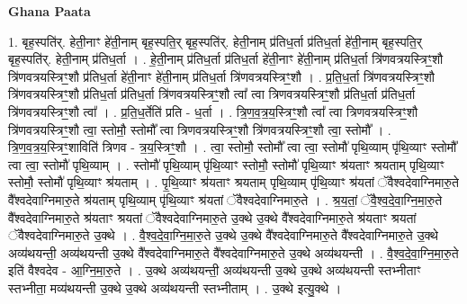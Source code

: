 \documentclass[17pt]{extarticle}
\begin{document}
\textbf{Ghana Paata } \newline

1. बृह॒स्पति॑र्. हेती॒नाꣳ हे॑ती॒नाम् बृह॒स्पति॒र् बृह॒स्पति॑र्. हेती॒नाम् प्र॑तिध॒र्ता प्र॑तिध॒र्ता हे॑ती॒नाम् बृह॒स्पति॒र् बृह॒स्पति॑र्. हेती॒नाम् प्र॑तिध॒र्ता । . हे॒ती॒नाम् प्र॑तिध॒र्ता प्र॑तिध॒र्ता हे॑ती॒नाꣳ हे॑ती॒नाम् प्र॑तिध॒र्ता त्रि॑णवत्रयस्त्रिꣳ॒॒शौ त्रि॑णवत्रयस्त्रिꣳ॒॒शौ प्र॑तिध॒र्ता हे॑ती॒नाꣳ हे॑ती॒नाम् प्र॑तिध॒र्ता त्रि॑णवत्रयस्त्रिꣳ॒॒शौ । . प्र॒ति॒ध॒र्ता त्रि॑णवत्रयस्त्रिꣳ॒॒शौ त्रि॑णवत्रयस्त्रिꣳ॒॒शौ प्र॑तिध॒र्ता प्र॑तिध॒र्ता त्रि॑णवत्रयस्त्रिꣳ॒॒शौ त्वा᳚ त्वा त्रिणवत्रयस्त्रिꣳ॒॒शौ प्र॑तिध॒र्ता प्र॑तिध॒र्ता त्रि॑णवत्रयस्त्रिꣳ॒॒शौ त्वा᳚ । . प्र॒ति॒ध॒र्तेति॑ प्रति - ध॒र्ता । . त्रि॒ण॒व॒त्र॒य॒स्त्रिꣳ॒॒शौ त्वा᳚ त्वा त्रिणवत्रयस्त्रिꣳ॒॒शौ त्रि॑णवत्रयस्त्रिꣳ॒॒शौ त्वा॒ स्तोमौ॒ स्तोमौ᳚ त्वा त्रिणवत्रयस्त्रिꣳ॒॒शौ त्रि॑णवत्रयस्त्रिꣳ॒॒शौ त्वा॒ स्तोमौ᳚ । . त्रि॒ण॒व॒त्र॒य॒स्त्रिꣳ॒॒शाविति॑ त्रिणव - त्र॒य॒स्त्रिꣳ॒॒शौ । . त्वा॒ स्तोमौ॒ स्तोमौ᳚ त्वा त्वा॒ स्तोमौ॑ पृथि॒व्याम् पृ॑थि॒व्याꣳ स्तोमौ᳚ त्वा त्वा॒ स्तोमौ॑ पृथि॒व्याम् । . स्तोमौ॑ पृथि॒व्याम् पृ॑थि॒व्याꣳ स्तोमौ॒ स्तोमौ॑ पृथि॒व्याꣳ श्र॑यताꣳ श्रयताम् पृथि॒व्याꣳ स्तोमौ॒ 
स्तोमौ॑ पृथि॒व्याꣳ श्र॑यताम् । . पृ॒थि॒व्याꣳ श्र॑यताꣳ श्रयताम् पृथि॒व्याम् पृ॑थि॒व्याꣳ श्र॑यतां ॅवैश्वदेवाग्निमारु॒ते 
वै᳚श्वदेवाग्निमारु॒ते श्र॑यताम् पृथि॒व्याम् पृ॑थि॒व्याꣳ श्र॑यतां ॅवैश्वदेवाग्निमारु॒ते । . श्र॒य॒तां॒ ॅवै॒श्व॒दे॒वा॒ग्नि॒मा॒रु॒ते वै᳚श्वदेवाग्निमारु॒ते श्र॑यताꣳ श्रयतां ॅवैश्वदेवाग्निमारु॒ते उ॒क्थे उ॒क्थे वै᳚श्वदेवाग्निमारु॒ते श्र॑यताꣳ श्रयतां ॅवैश्वदेवाग्निमारु॒ते उ॒क्थे । . वै॒श्व॒दे॒वा॒ग्नि॒मा॒रु॒ते उ॒क्थे उ॒क्थे वै᳚श्वदेवाग्निमारु॒ते वै᳚श्वदेवाग्निमारु॒ते उ॒क्थे अव्य॑थयन्ती॒ अव्य॑थयन्ती उ॒क्थे वै᳚श्वदेवाग्निमारु॒ते वै᳚श्वदेवाग्निमारु॒ते उ॒क्थे अव्य॑थयन्ती । . वै॒श्व॒दे॒वा॒ग्नि॒मा॒रु॒ते इति॑ वैश्वदेव - आ॒ग्नि॒मा॒रु॒ते । . उ॒क्थे अव्य॑थयन्ती॒ अव्य॑थयन्ती उ॒क्थे उ॒क्थे अव्य॑थयन्ती स्तभ्नीताꣳ स्तभ्नीता॒ मव्य॑थयन्ती उ॒क्थे उ॒क्थे अव्य॑थयन्ती स्तभ्नीताम् । . उ॒क्थे इत्यु॒क्थे । \newline
\end{document}
